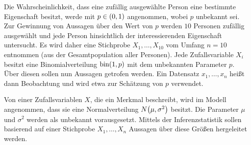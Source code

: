 \documentclass{lecture}
\begin{document}
    \begin{example}
        Die Wahrscheinlichkeit, dass eine zufällig ausgewählte Person eine bestimmte Eigenschaft besitzt, werde mit \(p \in \parentheses*{0, 1}\) angenommen, wobei \(p\) unbekannt sei.
        Zur Gewinnung von Aussagen über den Wert von \(p\) werden \(10\) Personen zufällig ausgewählt und jede Person hinsichtlich der interessierenden Eigenschaft untersucht.
        Es wird daher eine Stichprobe \(X_1, \ldots, X_{10}\) vom Umfang \(n = 10\) entnommen (aus der Gesamtpopulation aller Personen).
        Jede Zufallsvariable \(X_i\) besitzt eine Binomialverteilung \(\bin\parentheses*{1, p}\) mit dem unbekannten Parameter \(p\).
        Über diesen sollen nun Aussagen getrofen werden.
        Ein Datensatz \(x_1, \ldots, x_n\) heißt dann Beobachtung und wird etwa zur Schätzung von \(p\) verwendet.
    \end{example}

    \begin{example}
        Von einer Zufallsvariablen \(X\), die ein Merkmal beschreibt, wird im Modell angenommen, dass sie eine Normalverteilung \(N\parentheses*{\mu, \sigma^2}\) besitzt.
        Die Parameter \(\mu\) und \(\sigma^2\) werden als unbekannt vorausgesetzt.
        Mittels der Inferenzstatistik sollen basierend auf einer Stichprobe \(X_1, \ldots, X_n\) Aussagen über diese Größen hergeleitet werden.
    \end{example}
\end{document}
